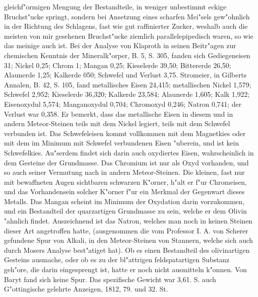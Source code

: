 \documentclass[a4paper, 11pt, oneside, polutonikogreek, german]{article}
\begin{document}
gleichf"ormigen Mengung der Bestandteile, in weniger unbestimmt eckige Bruchst"ucke springt, sondern bei Ansetzung eines scharfen Mei"sels gew"ohnlich in der Richtung des Schlagens, fast wie gut raffinierter Zucker, weshalb auch die meisten von mir gesehenen Bruchst"ucke ziemlich parallelepipedisch waren, so wie das meinige auch ist. Bei der Analyse von Klaproth in seinen Beitr"agen zur chemischen Kenntnis der Mineralk"orper, B. 5, S. 305, fanden sich Gediegeneisen 31; Nickel 0,25; Chrom 1; Mangan 0,25; Kieselerde 39,50; Bittererde 26,50; Alaunerde 1,25; Kalkerde 050; Schwefel und Verlust 3,75. Stromeier, in Gilberts Annalen, B. 42, S. 105, fand metallisches Eisen 24,415; metallischen Nickel 1,579; Schwefel 2,952; Kieselerde 36,320; Kalkerde 23,584; Alaunerde 1,605; Kalk 1,922; Eisenoxydul 5,574; Manganoxydul 0,704; Chromoxyd 0,246; Natron 0,741; der Verlust war 0,358. Er bemerkt, dass das metallische Eisen in diesem und in andern Meteor-Steinen teils mit dem Nickel legiert, teils mit dem Schwefel verbunden ist. Das Schwefeleisen kommt vollkommen mit dem Magnetkies oder mit dem im Minimum mit Schwefel verbundenen Eisen "uberein, und ist kein Schwefelkies. Au"serdem findet sich darin auch oxydiertes Eisen, wahrscheinlich in dem Gesteine der Grundmasse. Das Chromium ist nur als Oxyd vorhanden, und so auch seiner Vermutung nach in andern Meteor-Steinen. Die kleinen, fast nur mit bewaffneten Augen sichtbaren schwarzen K"orner, h"alt er f"ur Chromeisen, und das Vorhandensein solcher K"orner f"ur ein Merkmal der Gegenwart dieses Metalls. Das Mangan scheint im Minimum der Oxydation darin vorzukommen, und ein Bestandteil der quarzartigen Grundmasse zu sein, welche er dem Olivin "ahnlich findet. Auszeichnend ist das Natron, welches man noch in keinen Steinen dieser Art angetroffen hatte, (ausgenommen die vom Professor I. A. von Scherer gefundene Spur von Alkali, in den Meteor-Steinen von Stannern, welche sich auch durch Mosers Analyse best"atiget hat). Ob es einen Bestandteil des olivinartigen Gesteins ausmache, oder ob es zu der bl"attrigen feldspatartigen Substanz geh"ore, die darin eingesprengt ist, hatte er noch nicht ausmitteln k"onnen. Von Baryt fand sich keine Spur. Das spezifische Gewicht war 3,61. S. auch G"ottingische gelehrte Anzeigen, 1812, 79. und 32. St.
\end{document}
